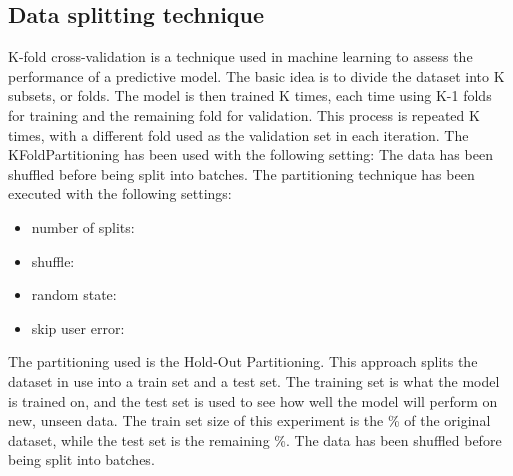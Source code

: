 \subsection{Data splitting technique}\label{subsec:partitioning}
K-fold cross-validation is a technique used in machine learning to assess the performance of a predictive model.
The basic idea is to divide the dataset into K subsets, or folds.
The model is then trained K times, each time using K-1 folds for training and the remaining fold for validation.
This process is repeated K times, with a different fold used as the validation set in each iteration.
\hfill\break
The KFoldPartitioning has been used with the following setting:
\hfill\break
{}
The data has been shuffled before being split into batches.
The partitioning technique has been executed with the following settings:
\begin{itemize}
    \item number of splits: 
    \item shuffle: 
    \item random state: 
    \item skip user error: 
\end{itemize}
\hfill\break

The partitioning used is the Hold-Out Partitioning.
This approach splits the dataset in use into a train set and a test set.
The training set is what the model is trained on, and the test set is used to see how
well the model will perform on new, unseen data.
\hfill\break
The train set size of this experiment is the \%
of the original dataset, while the test set is the remaining \%.
\hfill\break
{}
The data has been shuffled before being split into batches.
\hfill\break
